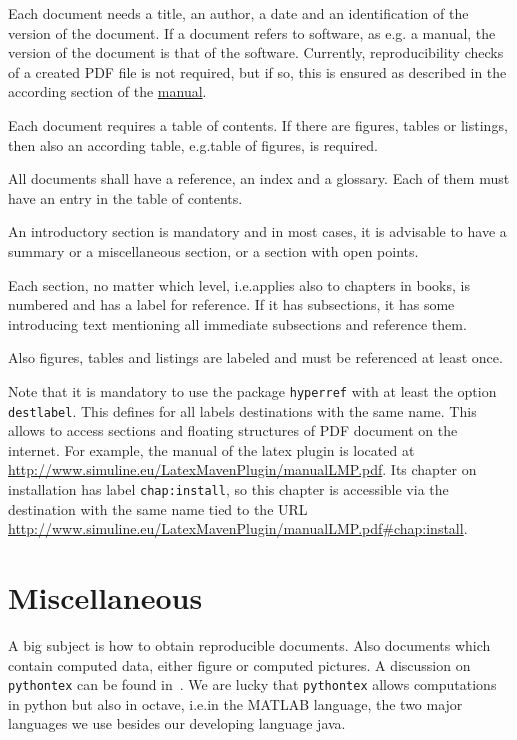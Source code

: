 \documentclass[a4paper,12pt]{article}
\begin{document}
Each document needs a title, an author, 
a date and an identification of the version of the document.  
If a document refers to software, as e.g\@. a manual, 
the version of the document is that of the software. 
Currently, reproducibility checks of a created PDF file is not required, 
but if so, this is ensured as described 
in the according section of the 
\href{http://www.simuline.eu/LatexMavenPlugin/manualLMP.pdf#sec:chkReprod}{manual}. 

Each document requires a table of contents. 
If there are figures, tables or listings, then also an according table, 
e.g.\@ table of figures, is required. 

All documents shall have a reference, an index and a glossary. 
Each of them must have an entry in the table of contents. 

An introductory section is mandatory and in most cases, 
it is advisable to have a summary or a miscellaneous section, 
or a section with open points. 

Each section, no matter which level, i.e.\@ applies also to chapters in books, 
is numbered and has a label for reference. 
If it has subsections, it has some introducing text mentioning all immediate subsections 
and reference them. 

Also figures, tables and listings are labeled and must be referenced at least once. 

Note that it is mandatory to use the package \texttt{hyperref} 
with at least the option \texttt{destlabel}. 
This defines for all labels destinations with the same name. 
This allows to access sections and floating structures 
of PDF document on the internet. 
For example, the manual of the latex plugin 
is located at \url{http://www.simuline.eu/LatexMavenPlugin/manualLMP.pdf}. 
Its chapter on installation has label \texttt{chap:install}, 
so this chapter is accessible 
via the destination with the same name 
tied to the URL 
\url{http://www.simuline.eu/LatexMavenPlugin/manualLMP.pdf#chap:install}. 


\section{Miscellaneous}\label{sec:misc}

A big subject is how to obtain reproducible documents. 
Also documents which contain computed data, either figure or computed pictures. 
A discussion on \texttt{pythontex} can be found in~\cite{Poo15}. 
We are lucky that \texttt{pythontex} allows computations in python but also in octave, 
i.e.\@ in the MATLAB language,  
the two major languages we use besides our developing language java. 
\end{document}
